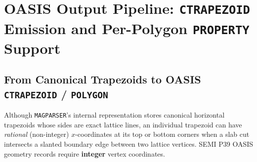 \chapter{OASIS Output Pipeline: \texttt{CTRAPEZOID} Emission and Per-Polygon \texttt{PROPERTY} Support}
\label{ch:oasis_props}

\section{From Canonical Trapezoids to OASIS \texttt{CTRAPEZOID} / \texttt{POLYGON}}

Although \texttt{MAGPARSER}'s internal representation stores canonical horizontal trapezoids whose sides are exact lattice lines, an individual trapezoid can have \emph{rational} (non-integer) $x$-coordinates at its top or bottom corners when a slab cut intersects a slanted boundary edge between two lattice vertices. SEMI P39 OASIS geometry records require \textbf{integer} vertex coordinates.

